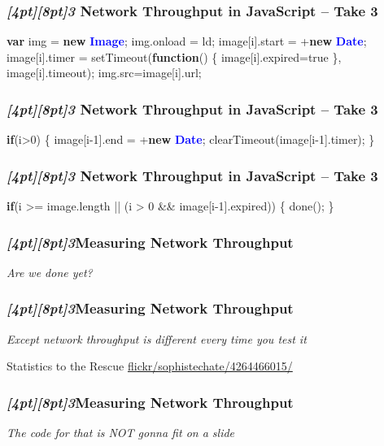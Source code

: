\documentclass{beamer}
\newcommand{\sn}[1]{\textrm{\textit{\Huge{\raisebox{-3pt}[4pt][8pt]{\textcolor{f2elblue}{#1}}}}}\hspace{4pt}}
\newcommand{\innersplash}[1]{
  \begin{center}
    \large \textrm{\textit{ #1 } }
  \end{center}
}
\newcommand{\splashslide}[2][{}]{
  \begin{frame}
  \frametitle{#1}
  \innersplash{#2}
  \end{frame}
}
\def\green<#1>#2{\textcolor<#1>{dark-green}{\textbf<#1>{#2}}}
\def\blue<#1>#2{\textcolor<#1>{blue}{\textbf<#1>{#2}}}
\begin{document}
\begin{frame}[fragile]
\frametitle{\sn{3} Network Throughput in JavaScript -- Take 3}
\begin{semiverbatim}
   \green<1>{var} img = \green<1>{new} \blue<1>{Image};
   img.onload = ld;
   image[i].start = +\green<1>{new} \blue<1>{Date};
   image[i].timer =
         setTimeout(\green<1>{function}() \{
                       image[i].expired=true
                    \},
                    image[i].timeout);
   img.src=image[i].url;
\end{semiverbatim}
\end{frame}

\begin{frame}[fragile]
\frametitle{\sn{3} Network Throughput in JavaScript -- Take 3}
\begin{semiverbatim}
\green<1>{if}(i>0) \{
   image[i-1].end = +\green<1>{new} \blue<1>{Date};
   clearTimeout(image[i-1].timer);
\}
\end{semiverbatim}
\end{frame}

\begin{frame}[fragile]
\frametitle{\sn{3} Network Throughput in JavaScript -- Take 3}
\begin{semiverbatim}
\green<1>{if}(i >= image.length
      || (i > 0 \&\& image[i-1].expired)) \{
   done();
\}
\end{semiverbatim}
\end{frame}

\splashslide[\sn{3}Measuring Network Throughput]{Are we done yet?\\ \only<2->{sure...}}

\splashslide[\sn{3}Measuring Network Throughput]{Except network throughput is different every time you test it}

\begin{frame}{Statistics to the Rescue}
\vspace{7.8cm}
\hspace{-1cm} \tiny \href{http://www.flickr.com/photos/sophistechate/4264466015/}{flickr/sophistechate/4264466015/}
\end{frame}

\splashslide[\sn{3}Measuring Network Throughput]{The code for that is NOT gonna fit on a slide}
\end{document}
